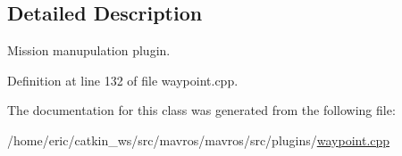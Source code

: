\subsection{Detailed Description}
Mission manupulation plugin. 

Definition at line 132 of file waypoint.\+cpp.



The documentation for this class was generated from the following file\+:\begin{DoxyCompactItemize}
\item 
/home/eric/catkin\+\_\+ws/src/mavros/mavros/src/plugins/\mbox{\hyperlink{waypoint_8cpp}{waypoint.\+cpp}}\end{DoxyCompactItemize}
